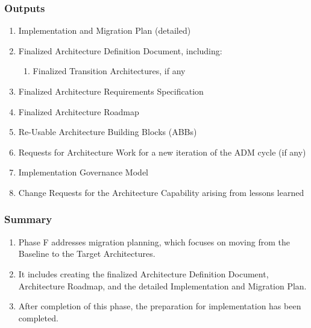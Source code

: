\documentclass[aspectratio=169, table]{beamer}
\begin{document}
	\begin{frame}
		\frametitle{Outputs}
		\vspace{20pt}
		\begin{enumerate}
			\item Implementation and Migration Plan (detailed)
			\item Finalized Architecture Definition Document, including:
			\begin{enumerate}
				\item Finalized Transition Architectures, if any
			\end{enumerate}
			\item Finalized Architecture Requirements Specification
			\item Finalized Architecture Roadmap
			\item Re-Usable Architecture Building Blocks (ABBs)
			\item Requests for Architecture Work for a new iteration of the ADM cycle (if any)
			\item Implementation Governance Model
			\item Change Requests for the Architecture Capability arising from lessons learned
		\end{enumerate}
	\end{frame}


	\begin{frame}
		\frametitle{Summary}
		\begin{enumerate}
			\item Phase F addresses migration planning, which focuses on moving from the Baseline to the Target Architectures.
			\item It includes creating the finalized Architecture Definition Document, Architecture Roadmap, and the detailed Implementation and Migration Plan.
			\item After completion of this phase, the preparation for implementation has been completed.
		\end{enumerate}
	\end{frame}
\end{document}
